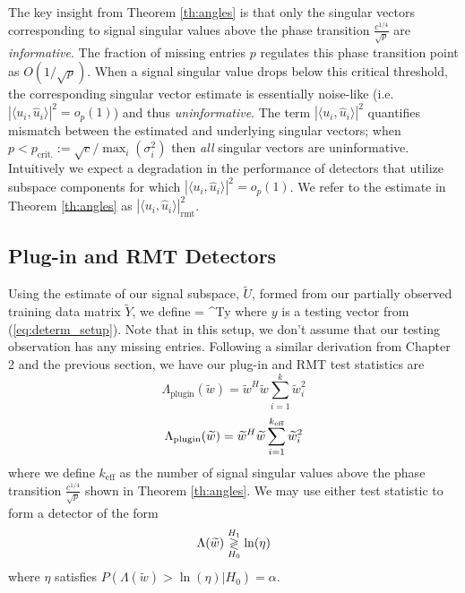 The key insight from Theorem \ref{th:angles} is that only the singular vectors
corresponding to signal singular values above the phase transition
$\frac{c^{1/4}}{\sqrt{p}}$ are \textit{informative}. The fraction of missing entries $p$
regulates this phase transition point as $O(1/\sqrt{p})$. When a signal singular value
drops below this critical threshold, the corresponding singular vector estimate is
essentially noise-like (i.e. $|\langle u_i,\widehat{u}_i\rangle|^2=o_{p}(1)$) and thus
\textit{uninformative}. The term $|\langle u_i,\widehat{u}_i\rangle|^2$ quantifies
mismatch between the estimated and underlying singular vectors; when $p < p_{\text{crit.}}
:=\sqrt{c}/\max_{i}(\sigma_{i}^{2})$ then \textit{all} singular vectors are
uninformative. Intuitively we expect a degradation in the performance of detectors that
utilize subspace components for which $|\langle u_i,\widehat{u}_i\rangle|^2=o_{p}(1)$.  We
refer to the estimate in Theorem \ref{th:angles} as $|\langle
u_i,\widehat{u}_i\rangle|^2_{\text{rmt}}$.

\subsection{Plug-in and RMT Detectors}\label{se:miss_detects}

Using the estimate of our signal subspace, $\widetilde{U}$, formed from our partially
observed training data matrix $\widetilde{Y}$, we define 
\be
{} = ^Ty
\ee
where $y$ is a testing vector from (\ref{eq:determ_setup}). Note that in this setup, we
don't assume that our testing observation has any missing entries. Following a similar
derivation from Chapter 2 and the previous section, we have our plug-in and RMT test
statistics are
\begin{equation}\label{eq:plugin missing}
\Lambda_{\text{plugin}}(\widetilde{w}) =\widetilde{w}^H\widetilde{w}\sum_{i=1}^k\widetilde{w}_i^2
\end{equation}
\begin{equation}\label{eq:rmt_missing}
\Lambda_{\text{plugin}}(\widetilde{w}) =\widetilde{w}^H\widetilde{w}\sum_{i=1}^{\keff}\widetilde{w}_i^2
\end{equation}
where we define $k_\text{eff}$ as the number of signal singular values above the phase
transition $\frac{c^{1/4}}{\sqrt{p}}$ shown in Theorem \ref{th:angles}. We may use either
test statistic to form a detector of the form 
\begin{equation}\label{eq:opt classifier}
\Lambda(\widetilde{w}) \detgtrless \ln(\eta)
\end{equation}
where $\eta$ satisfies $P(\Lambda(\widetilde{w})>\ln\left(\eta\right)|H_0)=\alpha$.

